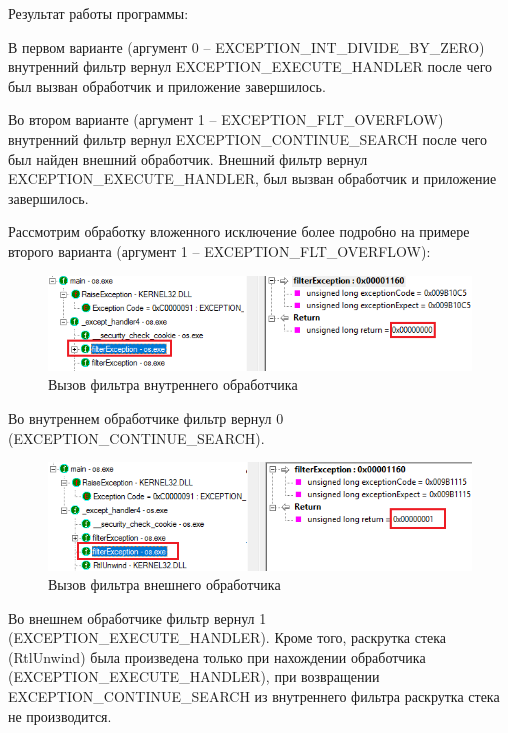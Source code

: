 \documentclass[14pt,a4paper,report]{report}
\begin{document}


Результат работы программы:



В первом варианте (аргумент 0 -- EXCEPTION\_INT\_DIVIDE\_BY\_ZERO) внутренний фильтр вернул EXCEPTION\_EXECUTE\_HANDLER после чего был вызван обработчик и приложение завершилось.

Во втором варианте (аргумент 1 -- EXCEPTION\_FLT\_OVERFLOW) внутренний фильтр вернул EXCEPTION\_CONTINUE\_SEARCH после чего был найден внешний обработчик. Внешний фильтр вернул EXCEPTION\_EXECUTE\_HANDLER, был вызван обработчик и приложение завершилось.

\clearpage

Рассмотрим обработку вложенного исключение более подробно на примере второго варианта (аргумент 1 -- EXCEPTION\_FLT\_OVERFLOW):

\begin{figure}[h!]
	\centering
	\includegraphics[scale = 0.85]{images/6_1.png}
	
	\caption{Вызов фильтра внутреннего обработчика}
	\label{image:6}
\end{figure}

Во внутреннем обработчике фильтр вернул 0 (EXCEPTION\_CONTINUE\_SEARCH).

\begin{figure}[h!]
	\centering
	\includegraphics[scale = 0.85]{images/6_2.png}
	\caption{Вызов фильтра внешнего обработчика}
\end{figure}

Во внешнем обработчике фильтр вернул 1 (EXCEPTION\_EXECUTE\_HANDLER). Кроме того, раскрутка стека (RtlUnwind) была произведена только при нахождении обработчика (EXCEPTION\_EXECUTE\_HANDLER), при возвращении EXCEPTION\_CONTINUE\_SEARCH из внутреннего фильтра раскрутка стека не производится.
\end{document}
